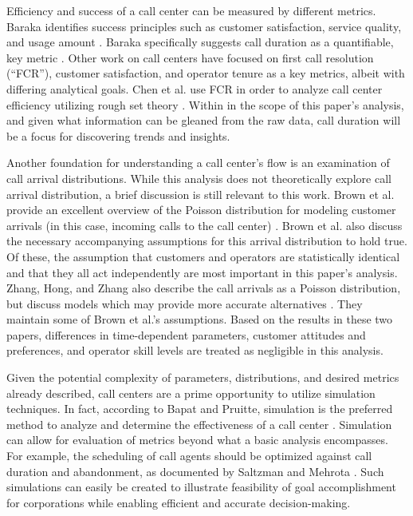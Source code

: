 \documentclass[12pt]{article}
\begin{document}
Efficiency and success of a call center can be measured by different metrics.  Baraka identifies success principles such as customer satisfaction, service quality, and usage amount \cite{baraka}. Baraka specifically suggests call duration as a quantifiable, key metric \cite{baraka}. Other work on call centers have focused on first call resolution (“FCR”), customer satisfaction, and operator tenure as a key metrics, albeit with differing analytical goals.  Chen et al. use FCR in order to analyze call center efficiency utilizing rough set theory \cite{chen}. Within in the scope of this paper’s analysis, and given what information can be gleaned from the raw data, call duration will be a focus for discovering trends and insights.
\par
Another foundation for understanding a call center’s flow is an examination of call arrival distributions. While this analysis does not theoretically explore call arrival distribution, a brief discussion is still relevant to this work. Brown et al. provide an excellent overview of the Poisson distribution for modeling customer arrivals (in this case, incoming calls to the call center) \cite{brown}.  Brown et al. also discuss the necessary accompanying assumptions for this arrival distribution to hold true. Of these, the assumption that customers and operators are statistically identical and that they all act independently are most important in this paper’s analysis. Zhang, Hong, and Zhang also describe the call arrivals as a Poisson distribution, but discuss models which may provide more accurate alternatives \cite{zhang}. They maintain some of Brown et al.’s assumptions. Based on the results in these two papers, differences in time-dependent parameters, customer attitudes and preferences, and operator skill levels are treated as negligible in this analysis.
\par
Given the potential complexity of parameters, distributions, and desired metrics already described, call centers are a prime opportunity to utilize simulation techniques.  In fact, according to Bapat and Pruitte, simulation is the preferred method to analyze and determine the effectiveness of a call center \cite{bapat}.  Simulation can allow for evaluation of metrics beyond what a basic analysis encompasses.  For example, the scheduling of call agents should be optimized against call duration and abandonment, as documented by Saltzman and Mehrota \cite{saltzman}.  Such simulations can easily be created to illustrate feasibility of goal accomplishment for corporations while enabling efficient and accurate decision-making\cite{saltzman2}.
\end{document}
